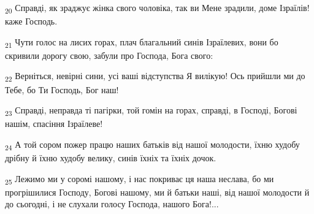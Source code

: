 \begin{tcolorbox}
\textsubscript{20} Справді, як зраджує жінка свого чоловіка, так ви Мене зрадили, доме Ізраїлів! каже Господь.
\end{tcolorbox}
\begin{tcolorbox}
\textsubscript{21} Чути голос на лисих горах, плач благальний синів Ізраїлевих, вони бо скривили дорогу свою, забули про Господа, Бога свого:
\end{tcolorbox}
\begin{tcolorbox}
\textsubscript{22} Верніться, невірні сини, усі ваші відступства Я вилікую! Ось прийшли ми до Тебе, бо Ти Господь, Бог наш!
\end{tcolorbox}
\begin{tcolorbox}
\textsubscript{23} Справді, неправда ті пагірки, той гомін на горах, справді, в Господі, Богові нашім, спасіння Ізраїлеве!
\end{tcolorbox}
\begin{tcolorbox}
\textsubscript{24} А той сором пожер працю наших батьків від нашої молодости, їхню худобу дрібну й їхню худобу велику, синів їхніх та їхніх дочок.
\end{tcolorbox}
\begin{tcolorbox}
\textsubscript{25} Лежимо ми у соромі нашому, і нас покриває ця наша неслава, бо ми прогрішилися Господу, Богові нашому, ми й батьки наші, від нашої молодости й до сьогодні, і не слухали голосу Господа, нашого Бога!...
\end{tcolorbox}
